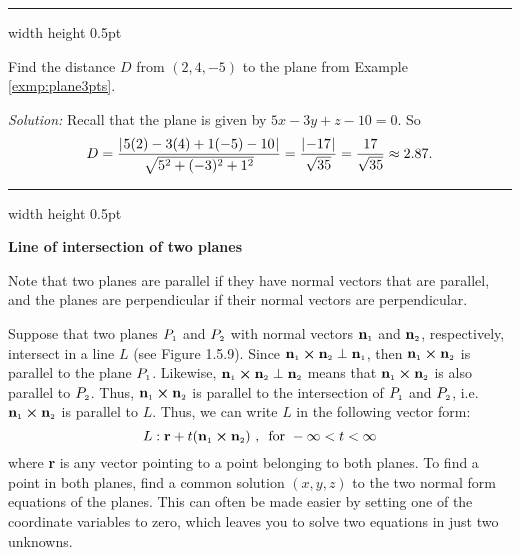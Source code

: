 \hrule width \textwidth height 0.5pt
\begin{exmp}\label{exmp:distptplane}
 Find the distance $D$ from $(2,4,-5)$ to the plane from Example \ref{exmp:plane3pts}.\smallskip
 \par\noindent\emph{Solution:} Recall that the plane is given by $5x - 3y + z - 10 = 0$. So
 \begin{displaymath}
  D = \frac{\lvert\mspace{1mu}5(2) - 3(4) + 1(-5) - 10\mspace{1mu}\rvert}{\sqrt{5^2 + (-3)^2 + 1^2}} = \frac{\lvert\mspace{1mu}-17\mspace{1mu}\rvert}{\sqrt{35}} =
   \frac{17}{\sqrt{35}} \approx 2.87.
 \end{displaymath}
\end{exmp}
\hrule width \textwidth height 0.5pt
\pagebreak[3]
\par\noindent\textbf{\large{Line of intersection of two planes}}\normalsize\smallskip

\piccaption[]{}
Note that two planes are parallel if they have normal vectors that are parallel, and the planes are perpendicular if
their normal vectors are perpendicular. 

Suppose
that two planes $P_{\scriptscriptstyle 1}$ and $P_{\scriptscriptstyle 2}$ with normal vectors $\textbf{n}_{\scriptscriptstyle 1}$ and $\textbf{n}_{\scriptscriptstyle 2}$,
respectively, intersect in a line $L$ (see Figure 1.5.9). 
Since $\textbf{n}_{\scriptscriptstyle 1} \bm{\times} \textbf{n}_{\scriptscriptstyle 2} \perp
\textbf{n}_{\scriptscriptstyle 1}$, then $\textbf{n}_{\scriptscriptstyle 1} \bm{\times} \textbf{n}_{\scriptscriptstyle 2}$ is parallel to the plane
$P_{\scriptscriptstyle 1}$. 
Likewise, $\textbf{n}_{\scriptscriptstyle 1} \bm{\times} \textbf{n}_{\scriptscriptstyle 2} \perp \textbf{n}_{\scriptscriptstyle 2}$ means
that $\textbf{n}_{\scriptscriptstyle 1} \bm{\times} \textbf{n}_{\scriptscriptstyle 2}$ is also parallel to $P_{\scriptscriptstyle 2}$. 
Thus,
$\textbf{n}_{\scriptscriptstyle 1} \bm{\times} \textbf{n}_{\scriptscriptstyle 2}$ is parallel to the intersection of $P_{\scriptscriptstyle 1}$ and
$P_{\scriptscriptstyle 2}$, i.e. $\textbf{n}_{\scriptscriptstyle 1} \bm{\times} \textbf{n}_{\scriptscriptstyle 2}$ is parallel to $L$. 
Thus, we can
write $L$ in the following vector form:
\begin{equation}
 L: \textbf{r} + t(\textbf{n}_{\scriptscriptstyle 1} \bm{\times} \textbf{n}_{\scriptscriptstyle 2}) \text{~,~~for~} -\infty < t < \infty
\end{equation}
where \textbf{r} is any vector pointing to a point belonging to both planes. To find a point in both planes,
find a common solution $(x,y,z)$ to the two normal form equations of the planes. 
This can often be made easier
by setting one of the coordinate variables to zero, which leaves you to solve two equations in just two unknowns.

